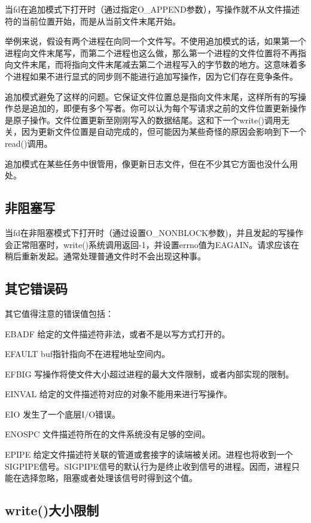 当fd在追加模式下打开时（通过指定O\_APPEND参数），写操作就不从文件描述符的当前位置开始，而是从当前文件末尾开始。

举例来说，假设有两个进程在向同一个文件写。不使用追加模式的话，如果第一个进程向文件末尾写，而第二个进程也这么做，那么第一个进程的文件位置将不再指向文件末尾，而将指向文件末尾减去第二个进程写入的字节数的地方。这意味着多个进程如果不进行显式的同步则不能进行追加写操作，因为它们存在竞争条件。

追加模式避免了这样的问题。它保证文件位置总是指向文件末尾，这样所有的写操作总是追加的，即便有多个写者。你可以认为每个写请求之前的文件位置更新操作是原子操作。文件位置更新至刚刚写入的数据结尾。这和下一个write()调用无关，因为更新文件位置是自动完成的，但可能因为某些奇怪的原因会影响到下一个read()调用。

追加模式在某些任务中很管用，像更新日志文件，但在不少其它方面也没什么用处。

\subsection{非阻塞写}
当fd在非阻塞模式下打开时（通过设置O\_NONBLOCK参数)，并且发起的写操作会正常阻塞时，write()系统调用返回-1，并设置errno值为EAGAIN。请求应该在稍后重新发起。通常处理普通文件时不会出现这种事。 

\subsection{其它错误码}
其它值得注意的错误值包括：
\begin{eqlist*}
\item [EBADF]
给定的文件描述符非法，或者不是以写方式打开的。 
\item [EFAULT]
buf指针指向不在进程地址空间内。 
\item [EFBIG]
写操作将使文件大小超过进程的最大文件限制，或者内部实现的限制。 
\item [EINVAL]
给定的文件描述符对应的对象不能用来进行写操作。 
\item [EIO]
发生了一个底层I/O错误。 
\item [ENOSPC]
文件描述符所在的文件系统没有足够的空间。 
\item [EPIPE]
给定文件描述符关联的管道或套接字的读端被关闭。进程也将收到一个SIGPIPE信号。SIGPIPE信号的默认行为是终止收到信号的进程。因而，进程只能在选择忽略，阻塞或者处理该信号时得到这个值。 
\end{eqlist*}

\subsection{write()大小限制}

